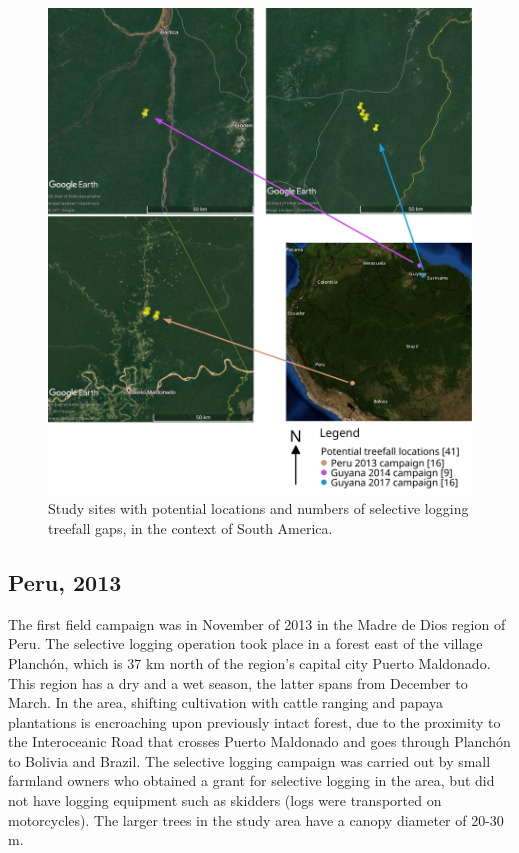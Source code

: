 \documentclass[a4paper,12pt]{scrbook}
\begin{document}
\begin{figure}
    \centering
    \includegraphics[width=\textwidth]{thesis-figures/17-all-sites-odg}
    \caption{Study sites with potential locations and numbers of selective logging treefall gaps, in the context of South America.}
    \label{fig-all-sites}
\end{figure}

\subsection{Peru, 2013}

The first field campaign was in November of 2013 in the Madre de Dios region of Peru. The selective logging operation took place in a forest east of the village Planchón, which is 37 km north of the region's capital city Puerto Maldonado. This region has a dry and a wet season, the latter spans from December to March. In the area, shifting cultivation with cattle ranging and papaya plantations is encroaching upon previously intact forest, due to the proximity to the Interoceanic Road that crosses Puerto Maldonado and goes through Planchón to Bolivia and Brazil. The selective logging campaign was carried out by small farmland owners who obtained a grant for selective logging in the area, but did not have logging equipment such as skidders (logs were transported on motorcycles). The larger trees in the study area have a canopy diameter of 20-30 m.
\end{document}
